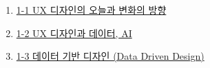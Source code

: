 \documentclass[
  letterpaper,
]{book}
\providecommand{\tightlist}{%
  \setlength{\itemsep}{0pt}\setlength{\parskip}{0pt}}\usepackage{longtable,booktabs,array}
\begin{document}
\begin{enumerate}
\def\labelenumi{\arabic{enumi}.}
\tightlist
\item
  \href{1-1\%20UX\%20디자인의\%20오늘과\%20변화의\%20방향.qmd}{1-1 UX
  디자인의 오늘과 변화의 방향}
\item
  \href{1-2\%20UX\%20디자인과\%20데이터,\%20AI.qmd}{1-2 UX 디자인과
  데이터, AI}
\item
  \href{1-3\%20데이터\%20기반\%20디자인\%20(Data\%20Driven\%20Design).qmd}{1-3
  데이터 기반 디자인 (Data Driven Design)}
\end{enumerate}


\backmatter
\printbibliography


\printindex
\end{document}
